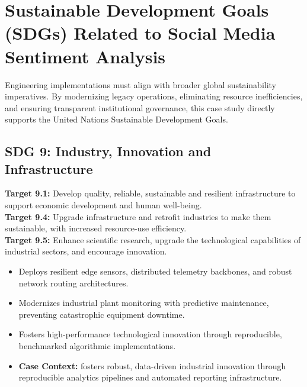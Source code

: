 \section{Sustainable Development Goals (SDGs) Related to Social Media Sentiment Analysis}
Engineering implementations must align with broader global sustainability imperatives. By modernizing legacy operations, eliminating resource inefficiencies, and ensuring transparent institutional governance, this case study directly supports the United Nations Sustainable Development Goals.

\subsection{SDG 9: Industry, Innovation and Infrastructure}
\noindent\textbf{Target 9.1:} Develop quality, reliable, sustainable and resilient infrastructure to support economic development and human well-being. \\
\noindent\textbf{Target 9.4:} Upgrade infrastructure and retrofit industries to make them sustainable, with increased resource-use efficiency. \\
\noindent\textbf{Target 9.5:} Enhance scientific research, upgrade the technological capabilities of industrial sectors, and encourage innovation.
\begin{itemize}
  \item Deploys resilient edge sensors, distributed telemetry backbones, and robust network routing architectures.
  \item Modernizes industrial plant monitoring with predictive maintenance, preventing catastrophic equipment downtime.
  \item Fosters high-performance technological innovation through reproducible, benchmarked algorithmic implementations.
  \item \textbf{Case Context:} fosters robust, data-driven industrial innovation through reproducible analytics pipelines and automated reporting infrastructure.
\end{itemize}
